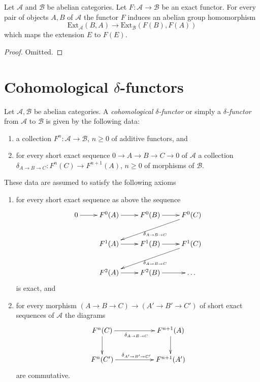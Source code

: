 \begin{lemma}
\label{lemma-exact-functor-ext}
Let $\mathcal{A}$ and $\mathcal{B}$ be abelian categories.
Let $F : \mathcal{A} \to \mathcal{B}$ be an exact functor.
For every pair of objects $A, B$ of $\mathcal{A}$ the
functor $F$ induces an abelian group homomorphism
$$
\text{Ext}_\mathcal{A}(B, A)
\longrightarrow
\text{Ext}_\mathcal{B}(F(B), F(A))
$$
which maps the extension $E$ to $F(E)$.
\end{lemma}

\begin{proof}
Omitted.
\end{proof}







\section{Cohomological $\delta$-functors}
\label{section-cohomological-delta-functor}

\begin{definition}
\label{definition-cohomological-delta-functor}
Let $\mathcal{A}, \mathcal{B}$ be abelian categories.
A {\it cohomological $\delta$-functor} or simply a
{\it $\delta$-functor} from $\mathcal{A}$
to $\mathcal{B}$ is given by the following data:
\begin{enumerate}
\item a collection $F^n : \mathcal{A} \to \mathcal{B}$, $n \geq 0$ of additive
functors, and
\item for every short exact sequence $0 \to A \to B \to C \to 0$
of $\mathcal{A}$
a collection $\delta_{A \to B \to C} : F^n(C) \to F^{n + 1}(A)$, $n \geq 0$
of morphisms of $\mathcal{B}$.
\end{enumerate}
These data are assumed to satisfy the following axioms
\begin{enumerate}
\item for every short exact sequence as above the sequence
$$
\xymatrix{
0 \ar[r] &
F^0(A) \ar[r] &
F^0(B) \ar[r] &
F^0(C) \ar[lld]^{\delta_{A \to B \to C}} \\
 &
F^1(A) \ar[r] &
F^1(B) \ar[r] &
F^1(C) \ar[lld]^{\delta_{A \to B \to C}} \\
 &
F^2(A) \ar[r] &
F^2(B) \ar[r] &
\ldots
}
$$
is exact, and
\item for every morphism $(A \to B \to C) \to (A' \to B' \to C')$
of short exact sequences of $\mathcal{A}$ the diagrams
$$
\xymatrix{
F^n(C) \ar[d] \ar[rr]_{\delta_{A \to B \to C}} & & F^{n + 1}(A) \ar[d] \\
F^n(C') \ar[rr]^{\delta_{A' \to B' \to C'}} & & F^{n + 1}(A')
}
$$
are commutative.
\end{enumerate}
\end{definition}

